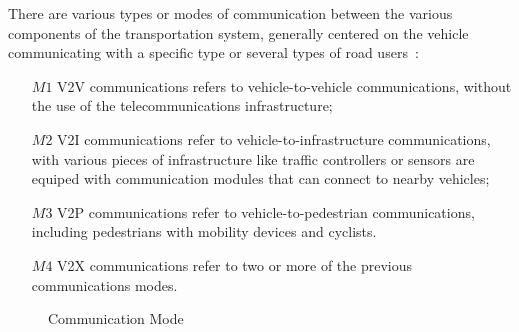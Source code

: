 There are various types or modes of communication between the various components of the transportation system, generally centered on the vehicle communicating with a specific type or several types of road users~\cite{araniti_lte_2013,molina-masegosa_lte-v_2017,shladover_connected_2018,dar_wireless_2010,abboud_interworking_2016,chen_lte-v_2016}: 


\begin{enumerate}
\item[$M1$] \acrfull{V2V} communications refers to vehicle-to-vehicle communications, without  the use of the telecommunications infrastructure;
\item[$M2$] \acrfull{V2I} communications refer to vehicle-to-infrastructure communications, with various pieces of infrastructure like traffic controllers or sensors are equiped with communication modules that can connect to nearby vehicles;
\item[$M3$] \acrfull{V2P} communications refer to vehicle-to-pedestrian communications, including pedestrians with mobility devices and cyclists. 
\item[$M4$] \acrfull{V2X} communications refer to two or more of the previous communications modes.
\end{enumerate}

\begin{figure}[ht!]
  \centering
  \caption{Communication Mode}
  \label{fig:com-mode}
\end{figure}

